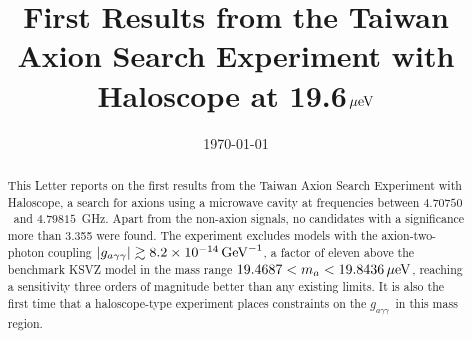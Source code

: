 \documentclass[%
 reprint,prl, %
superscriptaddress,
 amsmath,amssymb,
 aps,
]{revtex4-2}
\newcommand{\gagg}{\ensuremath{\left|g_{a\gamma\gamma}\right|}}
\newcommand{\bgagg}{\ensuremath{g_{a\gamma\gamma}}}
\newcommand{\ma}{\ensuremath{m_a}}
\newcommand{\muevcc}{\ensuremath{\,\mu\text{e\hspace{-.08em}V}}}
\newcommand{\GeVinv}{\ensuremath{\,\text{Ge\hspace{-.08em}V}^{-1}}}
\newcommand{\flo}{\ensuremath{4.70750}}
\newcommand{\fhi}{\ensuremath{4.79815}}
\newcommand{\mlo}{\ensuremath{19.4687}}
\newcommand{\mhi}{\ensuremath{19.8436}}
\newcommand{\avelimit}{\ensuremath{8.2\times 10^{-14}}} %
\begin{document}

\title{First Results from the Taiwan Axion Search Experiment with Haloscope at 19.6\muevcc}%



\date{\today}%

\begin{abstract}

 This Letter reports on the first results from the 
Taiwan Axion Search Experiment with Haloscope, a search for axions 
using a microwave cavity at frequencies between \flo\ and \fhi~GHz. 
Apart from the non-axion signals, no candidates with 
a significance more than 3.355 were found. The experiment excludes 
models with the axion-two-photon coupling $\gagg\gtrsim \avelimit\GeVinv$, 
a factor of eleven above the benchmark 
KSVZ model in the mass range $\mlo < \ma < \mhi \muevcc$, reaching 
a sensitivity three orders of magnitude better than any existing limits. 
 It is also the first time that a haloscope-type experiment places 
constraints on the \bgagg\ in this mass region.


\end{abstract}

\maketitle
\end{document}
